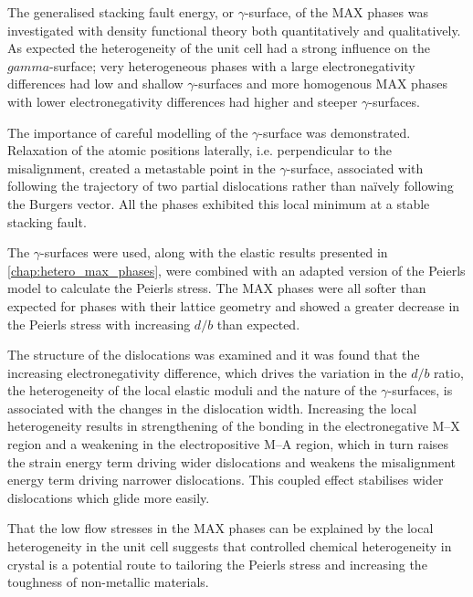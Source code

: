 The generalised stacking fault energy, or $\gamma$-surface, of the MAX phases was investigated with density functional theory both quantitatively and qualitatively. As expected the heterogeneity of the unit cell had a strong influence on the $gamma$-surface; very heterogeneous phases with a large electronegativity differences had low and shallow $\gamma$-surfaces and more homogenous MAX phases with lower electronegativity differences had higher and steeper $\gamma$-surfaces.

The importance of careful modelling of the $\gamma$-surface was demonstrated. Relaxation of the atomic positions laterally, i.e. perpendicular to the misalignment, created a metastable point in the $\gamma$-surface, associated with following the trajectory of two partial dislocations rather than na\"{i}vely following the Burgers vector. All the phases exhibited this local minimum at a stable stacking fault.

The $\gamma$-surfaces were used, along with the elastic results presented in \autoref{chap:hetero_max_phases}, were combined with an adapted version of the Peierls model to calculate the Peierls stress. The MAX phases were all softer than expected for phases with their lattice geometry and showed a greater decrease in the Peierls stress with increasing $d/b$ than expected.

The structure of the dislocations was examined and it was found that the increasing electronegativity difference, which drives the variation in the $d/b$ ratio, the heterogeneity of the local elastic moduli and the nature of the $\gamma$-surfaces, is associated with the changes in the dislocation width. Increasing the local heterogeneity results in strengthening of the bonding in the electronegative M--X region and a weakening in the electropositive M--A region, which in turn raises the strain energy term driving wider dislocations and weakens the misalignment energy term driving narrower dislocations. This coupled effect stabilises wider dislocations which glide more easily.


That the low flow stresses in the MAX phases can be explained by the local heterogeneity in the unit cell suggests that controlled chemical heterogeneity in crystal is a potential route to tailoring the Peierls stress and increasing the toughness of non-metallic materials.






























